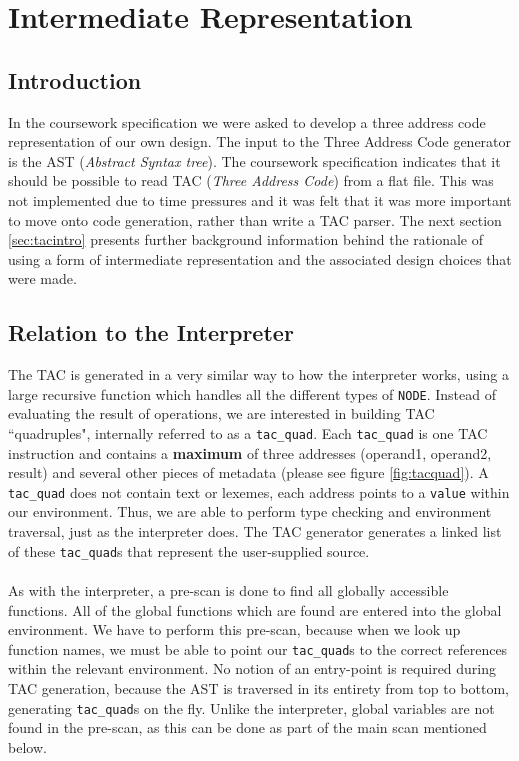 \section{Intermediate Representation}

\subsection{Introduction}
\label{sec:tacshortintro}
In the coursework specification we were asked to develop a three address code representation of our own design. The input to the Three Address Code generator is the AST (\emph{Abstract Syntax tree}). The coursework specification indicates that it should be possible to read TAC (\emph{Three Address Code}) from a flat file. This was not implemented due to time pressures and it was felt that it was more important to move onto code generation, rather than write a TAC parser. The next section \ref{sec:tacintro} presents further background information behind the rationale of using a form of intermediate representation and the associated design choices that were made.

\subsection{Relation to the Interpreter}
The TAC is generated in a very similar way to how the interpreter works, using a large recursive function which handles all the different types of \verb!NODE!. Instead of evaluating the result of operations, we are interested in building TAC ``quadruples", internally referred to as a \verb!tac_quad!. Each \verb!tac_quad! is one TAC instruction and contains a \textbf{maximum} of three addresses (operand1, operand2, result) and several other pieces of metadata (please see figure \ref{fig:tacquad}). A \verb!tac_quad! does not contain text or lexemes, each address points to a \verb!value! within our environment. Thus, we are able to perform type checking and environment traversal, just as the interpreter does. The TAC generator generates a linked list of these \verb!tac_quad!s that represent the user-supplied \mmc source.
\ \\ \ \\
As with the interpreter, a pre-scan is done to find all globally accessible functions. All of the global functions which are found are entered into the global environment. We have to perform this pre-scan, because when we look up function names, we must be able to point our \verb!tac_quad!s to the correct references within the relevant environment. No notion of an entry-point is required during TAC generation, because the AST is traversed in its entirety from top to bottom, generating \verb!tac_quad!s on the fly. Unlike the interpreter, global variables are not found in the pre-scan, as this can be done as part of the main scan mentioned below.

